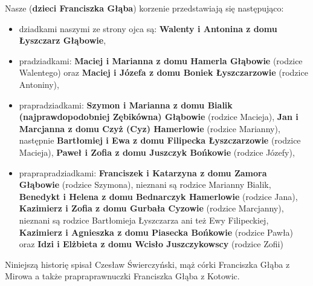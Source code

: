 Nasze (\textbf{dzieci Franciszka Głąba}) korzenie przedstawiają się następująco: 
\begin{itemize}
\item dziadkami naszymi ze strony ojca są: \textbf{Walenty i Antonina z domu Łyszczarz Głąbowie}, 
\item pradziadkami: \textbf{Maciej i Marianna z domu Hamerla Głąbowie} (rodzice Walentego) oraz \textbf{Maciej i Józefa z domu Boniek Łyszczarzowie} (rodzice Antoniny),
\item prapradziadkami: \textbf{Szymon i Marianna z domu Bialik (najprawdopodobniej Zębikówna) Głąbowie} (rodzice Macieja), \textbf{Jan i Marcjanna z domu Czyż (Cyz) Hamerlowie} (rodzice Marianny), następnie \textbf{Bartłomiej i Ewa z domu Filipecka Łyszczarzowie} (rodzice Macieja), \textbf{Paweł i Zofia z domu Juszczyk Bońkowie} (rodzice Józefy),
\item praprapradziadkami: \textbf{Franciszek i Katarzyna z domu Zamora Głąbowie} (rodzice Szymona), nieznani są rodzice Marianny Bialik, \textbf{Benedykt i Helena z domu Bednarczyk Hamerlowie} (rodzice Jana), \textbf{Kazimierz i Zofia z domu Gurbała Cyzowie} (rodzice Marcjanny), nieznani są rodzice Bartłomieja Łyszczarza ani też Ewy Filipeckiej, \textbf{Kazimierz i Agnieszka z domu Piasecka Bońkowie} (rodzice Pawła) oraz \textbf{Idzi i Elżbieta z domu Wcisło Juszczykowscy} (rodzice Zofii)
\end{itemize}


Niniejszą historię spisał Czesław Świerczyński, 
mąż córki Franciszka Głąba z Mirowa 
a także prapraprawnuczki Franciszka Głąba z Kotowic.




